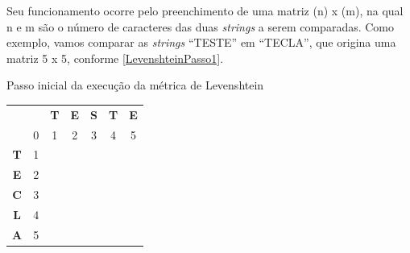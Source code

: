 Seu funcionamento ocorre pelo preenchimento de uma matriz (n) x (m), na qual n e m são o número de caracteres das duas \textit{strings} a serem comparadas. Como exemplo, vamos comparar as \textit{strings} ``TESTE'' em ``TECLA'', que origina uma matriz 5 x 5, conforme \autoref{LevenshteinPasso1}. 

\begin{quadro}[h]
\caption{Passo inicial da execução da métrica de Levenshtein}
\label{LevenshteinPasso1}
\centering
\begin{tabular}{cc|c|c|c|c|c|}
\textbf{}  & \textbf{} & \textbf{T} & \textbf{E} & \textbf{S} & \textbf{T} & \textbf{E} \\ 
\textbf{}  & 0         & 1          & 2          & 3          & 4          & 5          \\ \hline
\textbf{T} & 1         &            &            &            &            &            \\ \hline
\textbf{E} & 2         &            &            &            &            &            \\ \hline
\textbf{C} & 3         &            &            &            &            &            \\ \hline
\textbf{L} & 4         &            &            &            &            &            \\ \hline
\textbf{A} & 5         &            &            &            &            &            \\ \hline
\end{tabular}
\end{quadro}

